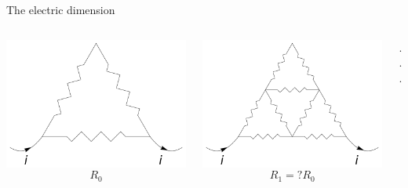 \documentclass[xcolor=x11names,compress,professionalfonts]{beamer}
\renewcommand{\(}{\begin{columns}}
\renewcommand{\)}{\end{columns}}
\newcommand{\<}[1]{\begin{column}{#1}}
\renewcommand{\>}{\end{column}}
\begin{document}
\begin{frame}{The electric dimension}

\begin{columns}
\newcommand{\s}{.2}
  \begin{column}{3cm}
  	\centering
    \includegraphics[scale=\s]{res0.pdf}
    \scriptsize
    \[ R_0 \]
  \end{column}

  \begin{column}{3cm}
  	\centering
     \includegraphics[scale=\s]{res1.pdf}
     \scriptsize
    \[ R_1= ? R_0 \]
  \end{column}
  
  \begin{column}{1cm}
  \centering
  ...
  \end{column}
  

\end{columns}
\end{frame}
\end{document}
